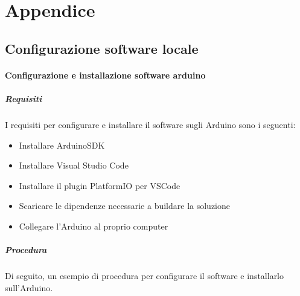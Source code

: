 \documentclass[12pt]{article}
\begin{document}
\appendix 
{} 
\section*{Appendice} 
 \subsection{Configurazione software locale}
 \paragraph{Configurazione e installazione software arduino}

\subparagraph{Requisiti}
I requisiti per configurare e installare il software sugli Arduino sono i seguenti:
\begin{itemize}
\item Installare ArduinoSDK
\item Installare Visual Studio Code
\item Installare il plugin PlatformIO per VSCode
\item Scaricare le dipendenze necessarie a buildare la soluzione
\item Collegare l'Arduino al proprio computer
\end{itemize}


\subparagraph{Procedura} 
Di seguito, un esempio di procedura per configurare il software e installarlo sull'Arduino.\\
\end{document}
